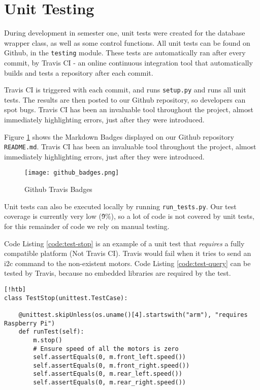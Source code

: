 \section{Unit Testing}
\label{sec:unit-testing}
\pagestyle{cameron}

During development in semester one, unit tests were created for the database wrapper class, as well as some control functions. All unit tests can be found on Github, in the \texttt{testing} module. These tests are automatically ran after every commit, by Travis \gls{CI} - an online continuous integration tool that automatically builds and tests a repository after each commit.

Travis \gls{CI} is triggered with each commit, and runs \texttt{setup.py} and runs all unit tests. The results are then posted to our Github repository, so developers can spot bugs. Travis CI has been an invaluable tool throughout the project, almost immediately highlighting errors, just after they were introduced.

Figure \ref{fig:github-badges} shows the Markdown Badges displayed on our Github repository \texttt{README.md}. Travis CI has been an invaluable tool throughout the project, almost immediately highlighting errors, just after they were introduced.

\begin{figure}[!htb]
\begin{center}
\texttt{[image: github\_badges.png]}
\end{center}
\caption{Github Travis Badges}
\label{fig:github-badges}
\end{figure}


Unit tests can also be executed locally by running \texttt{run\_tests.py}. Our test coverage is currently very low (\~9\%), so a lot of code is not covered by unit tests, for this remainder of code we rely on manual testing.

Code Listing \ref{code:test-stop} is an example of a unit test that \textit{requires} a fully compatible platform (Not Travis CI). Travis would fail when it tries to send an \gls{i2c} command to the non-existent motors.  Code Listing \ref{code:test-query} can be tested by Travis, because no embedded libraries are required by the test.

\begin{lstlisting}[style=custompython,label=code:test-stop][!htb]
class TestStop(unittest.TestCase):

    @unittest.skipUnless(os.uname()[4].startswith("arm"), "requires Raspberry Pi")
    def runTest(self):
        m.stop()
        # Ensure speed of all the motors is zero
        self.assertEquals(0, m.front_left.speed())
        self.assertEquals(0, m.front_right.speed())
        self.assertEquals(0, m.rear_left.speed())
        self.assertEquals(0, m.rear_right.speed())
\end{lstlisting}

